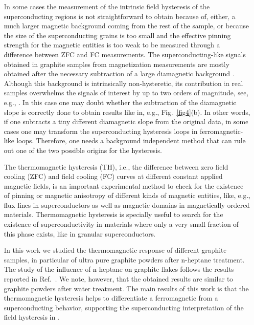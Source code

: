 \documentclass[aps,dvipsnames,twocolumn,floatfix,amsmath]{revtex4-1}
\begin{document}
In some cases the measurement of the intrinsic field hysteresis of
the superconducting regions is not straightforward to obtain
because of, either, a much larger magnetic background coming from
the rest of the sample,  or because the size of the
superconducting grains is too small and the effective pinning
strength for the magnetic entities is too weak to be measured
through a difference between ZFC and FC measurements. The
superconducting-like signals obtained in graphite samples from
magnetization measurements are mostly obtained after the necessary
subtraction of a large diamagnetic background \cite{yakovjltp00}.
Although this background is intrinsically non-hysteretic, its
contribution in real samples overwhelms the signals of interest by
up to two orders of magnitude, see, e.g.,
\cite{yakovjltp00,schcar}. In this case one may doubt whether the
subtraction of the diamagnetic slope is correctly done to obtain
results like in, e.g., Fig.~\ref{fig4}(b). In other words, if one
subtracts a tiny different diamagnetic slope from the original
data, in some cases one may transform the superconducting
hysteresis loops in ferromagnetic-like loops. Therefore, one needs
a background independent method that can rule out one of the two
possible origins for the hysteresis.

The thermomagnetic hysteresis (TH), i.e.,  the difference between
zero field cooling (ZFC) and field cooling (FC) curves at
different constant applied magnetic fields, is an important
experimental method to check for the existence of  pinning or
magnetic anisotropy of different kinds of  magnetic entities,
like, e.g., flux lines in superconductors as well as magnetic
domains in magnetically ordered materials. Thermomagnetic hysteresis is specially
useful to search for the existence of superconductivity in
materials where only a very small fraction of this phase exists,
like in granular superconductors.

In this work we studied the thermomagnetic response of different
graphite samples, in particular of ultra pure graphite powders
after n-heptane treatment. The study of the influence of n-heptane
on graphite flakes follows the results reported in
Ref.~\cite{kaw13}. We note, however, that the obtained results are
similar to graphite powders after water treatment. The main
results of this work is that the thermomagnetic hysteresis helps
to differentiate a ferromagnetic from a superconducting behavior,
supporting the superconducting interpretation of the field
hysteresis in \cite{yakovjltp00,sch12,schcar}.
\end{document}
